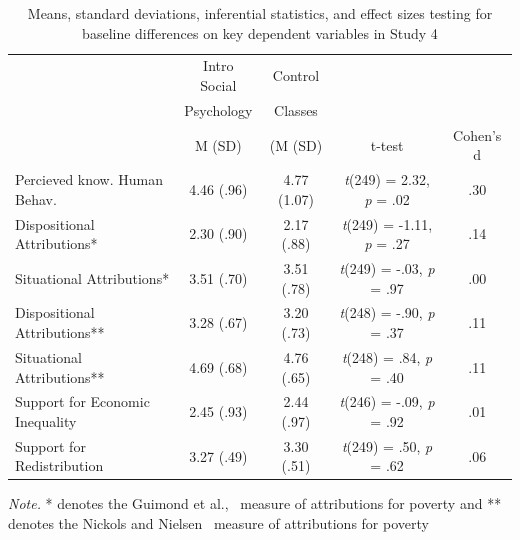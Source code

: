 \documentclass{sfuthesis}
\begin{document}
\begin{table}[h]
  \begin{center}
    \caption{Means, standard deviations, inferential statistics, and effect sizes testing for baseline differences on key dependent variables in Study 4}
    \label{tab:eleventhtable}
    \begin{tabular}{l c c c c}
    \hline
      & \multicolumn{1}{c}{Intro Social} & \multicolumn{1}{c}{Control} & & \\
      & \multicolumn{1}{c}{Psychology} & \multicolumn{1}{c}{Classes} & & \\\cmidrule{2-3}
      & \multicolumn{1}{c}{M (SD)} & \multicolumn{1}{c}{(M (SD)} & t-test & Cohen's d\\
      \hline
      Percieved know. Human Behav. & \multicolumn{1}{c}{4.46 (.96)} & \multicolumn{1}{c}{4.77 (1.07)} & \multicolumn{1}{c}{\textit{t}(249) = 2.32, \textit{p} = .02} & .30\\
      Dispositional Attributions* & \multicolumn{1}{c}{2.30 (.90)} & \multicolumn{1}{c}{2.17 (.88)} & \multicolumn{1}{c}{\textit{t}(249) = -1.11, \textit{p} = .27} & .14\\
      Situational Attributions* & \multicolumn{1}{c}{3.51 (.70)} & \multicolumn{1}{c}{3.51 (.78)} & \multicolumn{1}{c}{\textit{t}(249) = -.03, \textit{p} = .97} & .00\\
      Dispositional Attributions** & \multicolumn{1}{c}{3.28 (.67)} & \multicolumn{1}{c}{3.20 (.73)} & \multicolumn{1}{c}{\textit{t}(248) = -.90, \textit{p} = .37} & .11\\
      Situational Attributions** & \multicolumn{1}{c}{4.69 (.68)} & \multicolumn{1}{c}{4.76 (.65)} & \multicolumn{1}{c}{\textit{t}(248) = .84, \textit{p} = .40} & .11\\
      Support for Economic Inequality & \multicolumn{1}{c}{2.45 (.93)} & \multicolumn{1}{c}{2.44 (.97)} & \multicolumn{1}{c}{\textit{t}(246) = -.09, \textit{p} = .92} & .01\\
      Support for Redistribution & \multicolumn{1}{c}{3.27 (.49)} & \multicolumn{1}{c}{3.30 (.51)} & \multicolumn{1}{c}{\textit{t}(249) = .50, \textit{p} = .62} & .06\\
      \hline
    \end{tabular}
  \end{center}
  \textit{Note.} * denotes the Guimond et al.,~\cite{guimond89} measure of attributions for poverty and ** denotes the Nickols and Nielsen~\cite{nickols11} measure of attributions for poverty
\end{table}
\end{document}
